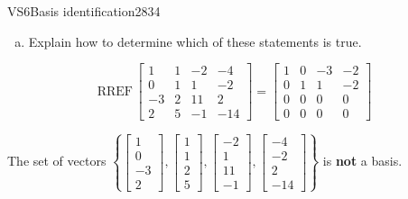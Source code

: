 \begin{exercise}{VS6}{Basis identification}{2834}
\begin{exerciseStatement}
\begin{enumerate}[(a)]
\begin{itemize}
 
\end{itemize}

     
\item  

 Explain how to determine which of these statements is true. 

 
\end{enumerate}

     \end{exerciseStatement}
 \begin{exerciseAnswer} 

 \[
\mathrm{RREF}\, \left[\begin{array}{cccc}
1 & 1 & -2 & -4 \\
0 & 1 & 1 & -2 \\
-3 & 2 & 11 & 2 \\
2 & 5 & -1 & -14
\end{array}\right] = \left[\begin{array}{cccc}
1 & 0 & -3 & -2 \\
0 & 1 & 1 & -2 \\
0 & 0 & 0 & 0 \\
0 & 0 & 0 & 0
\end{array}\right]
            \] 

 

 The set of vectors \(\left\{ \left[\begin{array}{c}
1 \\
0 \\
-3 \\
2
\end{array}\right] , \left[\begin{array}{c}
1 \\
1 \\
2 \\
5
\end{array}\right] , \left[\begin{array}{c}
-2 \\
1 \\
11 \\
-1
\end{array}\right] , \left[\begin{array}{c}
-4 \\
-2 \\
2 \\
-14
\end{array}\right] \right\}\) is \textbf{not} a basis. 

 \end{exerciseAnswer}
 \end{exercise}


